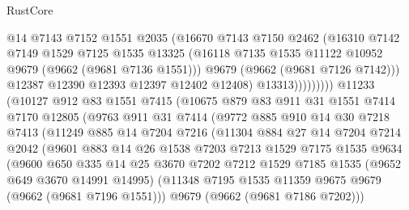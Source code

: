 \begin{lexlean}{RustCore}
\begin{coremodule}
                          @14
                          @7143
                          @7152
                          @1551
                          @2035
                          (@16670
                            @7143
                            @7150
                            @2462
                            (@16310
                              @7142
                              @7149
                              @1529
                              @7125
                              @1535
                              @13325
                              (@16118 @7135 @1535 @11122 @10952 @9679 (@9662 (@9681 @7136 @1551)))
                              @9679
                              (@9662 (@9681 @7126 @7142)))
                            @12387
                            @12390
                            @12393
                            @12397
                            @12402
                            @12408)
                          @13313)))))))))
        @11233
        (@10127
          @912
          @83
          @1551
          @7415
          (@10675
            @879
            @83
            @911
            @31
            @1551
            @7414
            @7170
            @12805
            (@9763
              @911
              @31
              @7414
              (@9772
                @885
                @910
                @14
                @30
                @7218
                @7413
                (@11249
                  @885
                  @14
                  @7204
                  @7216
                  (@11304
                    @884
                    @27
                    @14
                    @7204
                    @7214
                    @2042
                    (@9601
                      @883
                      @14
                      @26
                      @1538
                      @7203
                      @7213
                      @1529
                      @7175
                      @1535
                      @9634
                      (@9600
                        @650
                        @335
                        @14
                        @25
                        @3670
                        @7202
                        @7212
                        @1529
                        @7185
                        @1535
                        (@9652 @649 @3670 @14991 @14995)
                        (@11348 @7195 @1535 @11359 @9675 @9679 (@9662 (@9681 @7196 @1551)))
                        @9679
                        (@9662 (@9681 @7186 @7202)))

\end{coremodule}
\end{lexlean}
